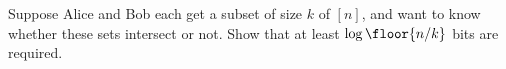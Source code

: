 Suppose Alice and Bob each get a subset of size $k$ of $[n]$, and want to know whether these sets
intersect or not. Show that at least $\log \floor{n / k}$ bits are required.